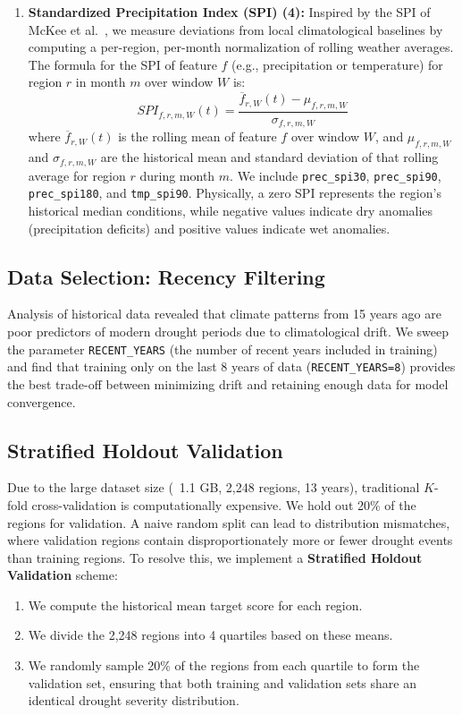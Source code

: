 \documentclass[conference]{IEEEtran}
\begin{document}
\begin{enumerate}
    \item \textbf{Standardized Precipitation Index (SPI) (4):} Inspired by the SPI of McKee et al.~\cite{mckee1993relationship}, we measure deviations from local climatological baselines by computing a per-region, per-month normalization of rolling weather averages. The formula for the SPI of feature $f$ (e.g., precipitation or temperature) for region $r$ in month $m$ over window $W$ is:
    \begin{equation}
        SPI_{f, r, m, W}(t) = \frac{\overline{f}_{r, W}(t) - \mu_{f, r, m, W}}{\sigma_{f, r, m, W}}
    \end{equation}
    where $\overline{f}_{r, W}(t)$ is the rolling mean of feature $f$ over window $W$, and $\mu_{f, r, m, W}$ and $\sigma_{f, r, m, W}$ are the historical mean and standard deviation of that rolling average for region $r$ during month $m$. We include \texttt{prec\_spi30}, \texttt{prec\_spi90}, \texttt{prec\_spi180}, and \texttt{tmp\_spi90}. Physically, a zero SPI represents the region's historical median conditions, while negative values indicate dry anomalies (precipitation deficits) and positive values indicate wet anomalies.
\end{enumerate}

\subsection{Data Selection: Recency Filtering}
Analysis of historical data revealed that climate patterns from 15 years ago are poor predictors of modern drought periods due to climatological drift. We sweep the parameter \texttt{RECENT\_YEARS} (the number of recent years included in training) and find that training only on the last 8 years of data (\texttt{RECENT\_YEARS=8}) provides the best trade-off between minimizing drift and retaining enough data for model convergence.

\subsection{Stratified Holdout Validation}
Due to the large dataset size (~1.1 GB, 2,248 regions, 13 years), traditional $K$-fold cross-validation is computationally expensive. We hold out 20\% of the regions for validation. 
A naive random split can lead to distribution mismatches, where validation regions contain disproportionately more or fewer drought events than training regions. To resolve this, we implement a \textbf{Stratified Holdout Validation} scheme:
\begin{enumerate}
    \item We compute the historical mean target score for each region.
    \item We divide the 2,248 regions into 4 quartiles based on these means.
    \item We randomly sample 20\% of the regions from each quartile to form the validation set, ensuring that both training and validation sets share an identical drought severity distribution.
\end{enumerate}
\end{document}
